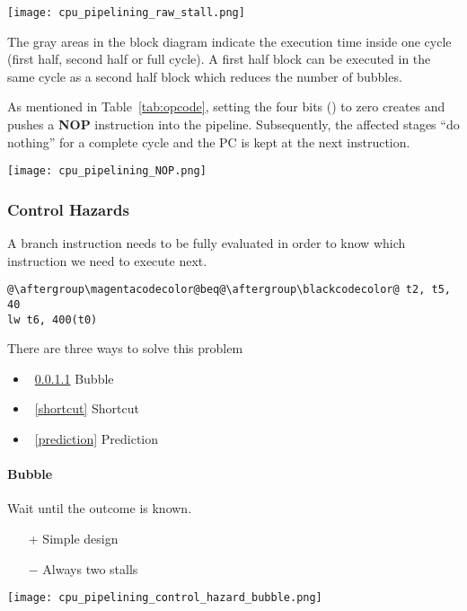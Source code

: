 \texttt{[image: cpu\_pipelining\_raw\_stall.png]}

The gray areas in the block diagram indicate the execution time inside one cycle (first half, second half or full cycle). A first half block can be executed in the same cycle as a second half block which reduces the number of bubbles.

\newpar{}
As mentioned in Table~\ref{tab:opcode}, setting the four bits () to zero creates and pushes a \textbf{NOP} instruction into the pipeline.
Subsequently, the affected stages ``do nothing'' for a complete cycle and the PC is kept at the next instruction.
\begin{center}
    \texttt{[image: cpu\_pipelining\_NOP.png]}
\end{center}

\subsubsection{Control Hazards}\label{control hazards}

A branch instruction needs to be fully evaluated in order to know which instruction we need to execute next.

\begin{lstlisting}[escapechar=@]
@\aftergroup\magentacodecolor@beq@\aftergroup\blackcodecolor@ t2, t5, 40
lw t6, 400(t0)
\end{lstlisting}

There are three ways to solve this problem
\begin{itemize}
    \item~\ref{bubble} Bubble
    \item~\ref{shortcut} Shortcut
    \item~\ref{prediction} Prediction
\end{itemize}

\paragraph{Bubble}\label{bubble}

Wait until the outcome is known.
\begin{itemize}
    \item[+] Simple design
    \item[$-$] Always two stalls
\end{itemize}

\texttt{[image: cpu\_pipelining\_control\_hazard\_bubble.png]}

